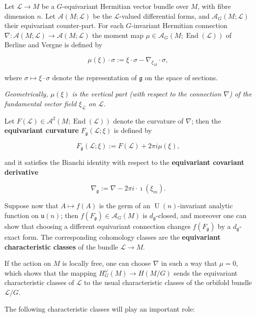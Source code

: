 \documentclass{article}
\newcommand{\ra}{\rightarrow}
\newcommand{\w}{\omega}
\newcommand{\mcA}{\mathcal{A}}
\newcommand{\mcL}{\mathcal{L}}
\newcommand{\mfg}{\mathfrak{g}}
\newcommand{\mf}[1]{\mathfrak{#1}}
\DeclareMathOperator{\End}{End}
\DeclareMathOperator{\UU}{U}
\begin{document}
	Let $\mcL \ra M$ be a $G$-equivariant Hermitian vector bundle over $M$, with fibre dimension $n$. Let $\mcA(M; \mcL)$ be the $\mcL$-valued differential forms, and $\mcA_{G}(M; \mcL)$ their equivariant counter-part. For each $G$-invariant Hermitian connection $\nabla : \mcA(M; \mcL) \ra \mcA(M; \mcL)$ the moment map $\mu \in \mcA_{G}(M; \End(\mcL))$ of Berline and Vergne \cite{Berline1985} is defined by
	
	\begin{equation*}
		\mu(\xi) \cdot \sigma := \xi \cdot \sigma - \nabla_{\xi_{M}} \cdot \sigma,
	\end{equation*}
	
	where $\sigma \mapsto \xi \cdot \sigma$ denote the representation of $\mfg$ on the space of sections.
	
	\emph{Geometrically, $\mu(\xi)$ is the vertical part (with respect to the connection $\nabla$) of the fundamental vector field $\xi_{\mcL}$ on $\mcL$.}
	
	Let $F(\mcL) \in \mcA^{2}(M; \End(\mcL))$ denote the curvature of $\nabla$; then the \textbf{equivariant curvature} $F_{\mfg}(\mcL; \xi)$ is defined by
	
	\begin{equation*}
		F_{\mfg}(\mcL;\xi) := F(\mcL) + 2\pi i \mu(\xi),
	\end{equation*}
	
	and it satisfies the Bianchi identity with respect to the \textbf{equivariant covariant derivative}
	
	\begin{equation*}
		\nabla_{\mfg} := \nabla - 2\pi i \cdot \imath(\xi_{m}).
	\end{equation*}
	
	Suppose now that $A \mapsto f(A)$ is the germ of an $\UU(n)$-invariant analytic function on $\mf{u}(n)$; then $f(F_{\mfg}) \in \mcA_{G}(M)$ is $d_{\mfg}$-closed, and moreover one can show that choosing a different equivariant connection changes $f(F_{\mfg})$ by a $d_{\mfg}$-exact form. The corresponding cohomology classes are the \textbf{equivariant characteristic classes} of the bundle $\mcL \ra M$.
	
	If the action on $M$ is locally free, one can choose $\nabla$ in such a way that $\mu = 0$, which shows that the mapping $H_{G}^{\w}(M) \ra H(M/G)$ sends the equivariant characteristic classes of $\mcL$ to the usual characteristic classes of the orbifold bundle $\mcL/G$.
	
	The following characteristic classes will play an important role:
	
\end{document}
